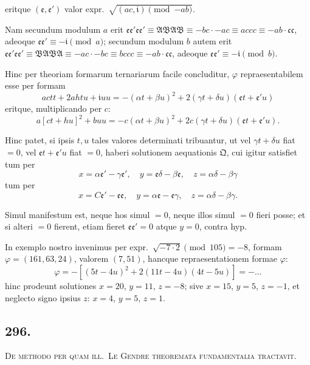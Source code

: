 \documentclass[12pt,a4paper]{article}
\theoremstyle{plain}
\theoremstyle{definition}
\theoremstyle{remark}
\begin{document}
eritque $(\mathfrak{e}, \mathfrak{e}')$ valor expr.\ $\sqrt{(ac, \mathfrak{i}) \pmod{-ab}}$.

Nam secundum modulum $a$ erit
$\mathfrak{e}\mathfrak{e}' \mathfrak{e}\mathfrak{e}' \equiv \mathfrak{A}\mathfrak{B}\mathfrak{A}\mathfrak{B} \equiv -bc \cdot -ac \equiv accc \equiv -ab \cdot \mathfrak{c}\mathfrak{c}$,
adeoque $\mathfrak{e}\mathfrak{e}' \equiv -\mathfrak{i} \pmod{a}$; secundum modulum $b$ autem erit
$\mathfrak{e}\mathfrak{e}' \mathfrak{e}\mathfrak{e}' \equiv \mathfrak{B}\mathfrak{A}\mathfrak{B}\mathfrak{A} \equiv -ac \cdot -bc \equiv bccc \equiv -ab \cdot \mathfrak{c}\mathfrak{c}$,
adeoque $\mathfrak{e}\mathfrak{e}' \equiv -\mathfrak{i} \pmod{b}$.

Hinc per theoriam formarum ternariarum facile concluditur, $\varphi$ repraesentabilem
esse per formam
\[
actt + 2ahtu + \mathfrak{i}uu = -(\alpha t + \beta u)^2 + 2(\gamma t + \delta u)(\mathfrak{e} t + \mathfrak{e}' u)
\]
eritque, multiplicando per $c$:
\[
a[ct + hu]^2 + buu = -c(\alpha t + \beta u)^2 + 2c(\gamma t + \delta u)(\mathfrak{e} t + \mathfrak{e}' u).
\]

Hinc patet, si ipsis $t, u$ tales valores determinati tribuantur, ut vel
$\gamma t + \delta u$ fiat $= 0$, vel $\mathfrak{e}t + \mathfrak{e}' u$ fiat $= 0$, haberi solutionem aequationis
$\mathfrak{Q}$, cui igitur satisfiet tum per
\[
x = \alpha\mathfrak{e}' - \gamma\mathfrak{e}', \quad y = \mathfrak{e}\delta - \beta\mathfrak{e}, \quad z = \alpha\delta - \beta\gamma
\]
tum per
\[
x = C\mathfrak{e}' - \mathfrak{e}\mathfrak{e}, \quad y = \alpha\mathfrak{e} - \mathfrak{e}\gamma, \quad z = \alpha\delta - \beta\gamma.
\]

Simul manifestum est, neque hos simul $= 0$, neque illos simul $= 0$ fieri
posse; et si alteri $= 0$ fierent, etiam fieret $\mathfrak{e}\mathfrak{e}' = 0$ atque $y = 0$, contra hyp.

In exemplo nostro invenimus per expr.\ $\sqrt{-7 \cdot 2} \pmod{105} = -8$,
formam $\varphi = (161, 63, 24)$, valorem $(7, 51)$, hancque repraesentationem
formae $\varphi$:
\[
\varphi = -[(5t - 4u)^2 + 2(11t - 4u)(4t - 5u)] = -\ldots
\]
hinc prodeunt solutiones $x = 20$, $y = 11$, $z = -8$; sive $x = 15$,
$y = 5$, $z = -1$, et neglecto signo ipsius $z$: $x = 4$, $y = 5$, $z = 1$.

\subsection*{296.}

\textsc{De methodo per quam ill.\ Le Gendre theoremata fundamentalia tractavit.}
\end{document}
